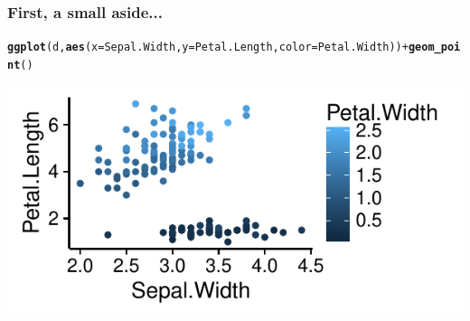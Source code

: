 \documentclass{beamer}\usepackage[]{graphicx}\usepackage[]{color}
\makeatletter
\def\maxwidth{ %
  \ifdim\Gin@nat@width>\linewidth
    \linewidth
  \else
    \Gin@nat@width
  \fi
}
\newcommand{\hlopt}[1]{\textcolor[rgb]{0,0,0}{#1}}%
\newcommand{\hlstd}[1]{\textcolor[rgb]{0.345,0.345,0.345}{#1}}%
\newcommand{\hlkwc}[1]{\textcolor[rgb]{0.333,0.667,0.333}{#1}}%
\newcommand{\hlkwd}[1]{\textcolor[rgb]{0.737,0.353,0.396}{\textbf{#1}}}%
\newenvironment{kframe}{%
 \def\at@end@of@kframe{}%
 \ifinner\ifhmode%
  \def\at@end@of@kframe{\end{minipage}}%
  \begin{minipage}{\columnwidth}%
 \fi\fi%
 \def\FrameCommand##1{\hskip\@totalleftmargin \hskip-\fboxsep
 \colorbox{shadecolor}{##1}\hskip-\fboxsep
     \hskip-\linewidth \hskip-\@totalleftmargin \hskip\columnwidth}%
 \MakeFramed {\advance\hsize-\width
   \@totalleftmargin\z@ \linewidth\hsize
   \@setminipage}}%
 {\par\unskip\endMakeFramed%
 \at@end@of@kframe}
\newenvironment{knitrout}{}{} %
\makeatother
\begin{document}
\begin{frame}[fragile]
\frametitle{First, a small aside...}

\begin{knitrout}
\color{fgcolor}\begin{kframe}
\begin{alltt}
\hlkwd{ggplot}\hlstd{(d,}\hlkwd{aes}\hlstd{(}\hlkwc{x}\hlstd{=Sepal.Width,} \hlkwc{y}\hlstd{=Petal.Length,} \hlkwc{color}\hlstd{=Petal.Width))} \hlopt{+} \hlkwd{geom_point}\hlstd{()}
\end{alltt}
\end{kframe}
\includegraphics[width=\maxwidth]{figure/unnamed-chunk-3-1} 

\end{knitrout}
\end{frame}
\end{document}

